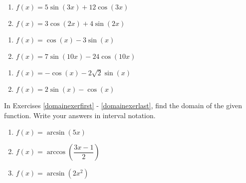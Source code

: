 \begin{multicols}{2}

\begin{enumerate}

\setcounter{enumi}{\value{HW}}

\item $f(x) = 5\sin(3x) + 12\cos(3x)$ \label{rewritesinusoidfirst}
\item $f(x) = 3\cos(2x) + 4\sin(2x)$

\setcounter{HW}{\value{enumi}}

\end{enumerate}

\end{multicols}

\begin{multicols}{2}

\begin{enumerate}

\setcounter{enumi}{\value{HW}}

\item $f(x) = \cos(x) - 3\sin(x)$
\item $f(x) = 7\sin(10x) - 24\cos(10x)$

\setcounter{HW}{\value{enumi}}

\end{enumerate}

\end{multicols}

\begin{multicols}{2}

\begin{enumerate}

\setcounter{enumi}{\value{HW}}

\item $f(x) = -\cos(x) - 2\sqrt{2} \sin(x)$
\item $f(x) = 2\sin(x) - \cos(x)$ \label{rewritesinusoidlast}

\setcounter{HW}{\value{enumi}}

\end{enumerate}

\end{multicols}

In Exercises \ref{domainexerfirst} - \ref{domainexerlast}, find the domain of the given function.  Write your answers in interval notation.

\begin{multicols}{3}

\begin{enumerate}

\setcounter{enumi}{\value{HW}}

\item  $f(x) = \arcsin(5x)$  \label{domainexerfirst}
\item  $f(x) = \arccos\left(\dfrac{3x-1}{2} \right)$
\item  $f(x) = \arcsin\left(2x^2\right)$ 

\setcounter{HW}{\value{enumi}}

\end{enumerate}

\end{multicols}

